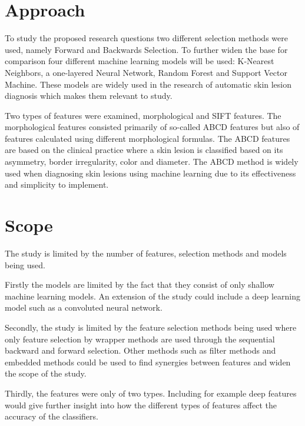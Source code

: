 \documentclass{kththesis}
\begin{document}
\section{Approach}

To study the proposed research questions two different selection methods were used, namely Forward and Backwards Selection. To further widen the base for comparison four different machine learning models will be used: K-Nearest Neighbors, a one-layered Neural Network, Random Forest and Support Vector Machine. These models are widely used in the research of automatic skin lesion diagnosis which makes them relevant to study. %

Two types of features were examined, morphological and SIFT features. The morphological features consisted primarily of so-called ABCD features but also of features calculated using different morphological formulas. The ABCD features are based on the clinical practice where a skin lesion is classified based on its asymmetry, border irregularity, color and diameter. The ABCD method is widely used when diagnosing skin lesions using machine learning due to its effectiveness and simplicity to implement. \parencite{JAIN2015735} %

\section{Scope}

The study is limited by the number of features, selection methods and models being used.

Firstly the models are limited by the fact that they consist of only shallow machine learning models. An extension of the study could include a deep learning model such as a convoluted neural network.

Secondly, the study is limited by the feature selection methods being used where only feature selection by wrapper methods are used through the sequential backward and forward selection. Other methods such as filter methods and embedded methods could be used to find synergies between features and widen the scope of the study.

Thirdly, the features were only of two types. Including for example deep features would give further insight into how the different types of features affect the accuracy of the classifiers.
\end{document}
